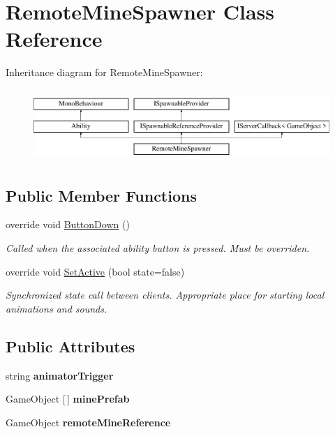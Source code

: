 \hypertarget{class_remote_mine_spawner}{}\section{Remote\+Mine\+Spawner Class Reference}
\label{class_remote_mine_spawner}
Inheritance diagram for Remote\+Mine\+Spawner\+:\begin{figure}[H]
\begin{center}
\leavevmode
\includegraphics[height=2.745098cm]{class_remote_mine_spawner}
\end{center}
\end{figure}
\subsection*{Public Member Functions}
\begin{DoxyCompactItemize}
\item 
override void \hyperlink{class_remote_mine_spawner_afc0682db95d366cbcb7db54fc4c192fa}{Button\+Down} ()
\begin{DoxyCompactList}\small\item\em Called when the associated ability button is pressed. Must be overriden. \end{DoxyCompactList}\item 
override void \hyperlink{class_remote_mine_spawner_a187f725c8c3246bd9de8b4be05143a8e}{Set\+Active} (bool state=false)
\begin{DoxyCompactList}\small\item\em Synchronized state call between clients. Appropriate place for starting local animations and sounds. \end{DoxyCompactList}\end{DoxyCompactItemize}
\subsection*{Public Attributes}
\begin{DoxyCompactItemize}
\item 
\hypertarget{class_remote_mine_spawner_af3108f74b8d70b5399a9c555059f2e0d}{}\label{class_remote_mine_spawner_af3108f74b8d70b5399a9c555059f2e0d} 
string {\bfseries animator\+Trigger}
\item 
\hypertarget{class_remote_mine_spawner_af1455989742c2c2e7695162de0388fd3}{}\label{class_remote_mine_spawner_af1455989742c2c2e7695162de0388fd3} 
Game\+Object \mbox{[}$\,$\mbox{]} {\bfseries mine\+Prefab}
\item 
\hypertarget{class_remote_mine_spawner_af748cd777bbfee5cdb88b26d53f1338e}{}\label{class_remote_mine_spawner_af748cd777bbfee5cdb88b26d53f1338e} 
Game\+Object {\bfseries remote\+Mine\+Reference}
\end{DoxyCompactItemize}
